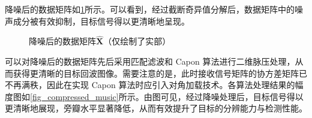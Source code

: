 \begin{solution}
    降噪后的数据矩阵如\cref{fig_denoised}所示。可以看到，经过截断奇异值分解后，数据矩阵中的噪声成分被有效抑制，目标信号得以更清晰地呈现。
    \begin{figure}[htb!]
        \centering
        \caption{降噪后的数据矩阵\( \hat{\mathbf{X}} \)（仅绘制了实部）}
        \label{fig_denoised}
    \end{figure}

    可以对降噪后的数据矩阵先后采用匹配滤波和 Capon 算法进行二维脉压处理，从而获得更清晰的目标回波图像。需要注意的是，此时接收信号矩阵的协方差矩阵已不再满秩，因此在实现 Capon 算法时应引入对角加载技术。各算法处理结果的幅度图如\cref{fig_compressed_music}所示。由图可见，经过降噪处理后，目标信号得以更清晰地展现，旁瓣水平显著降低，从而有效提升了目标的分辨能力与检测性能。


\end{solution}
